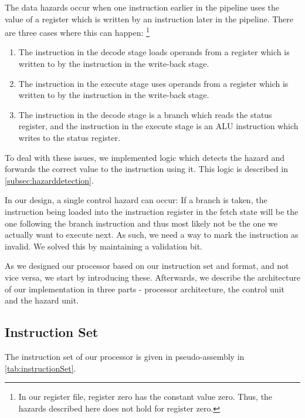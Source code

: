 \documentclass[11pt]{article}
\begin{document}
The data hazards occur when one instruction earlier in the pipeline
uses the value of a register which is written by an instruction later
in the pipeline. There are three cases where this can happen:
\footnote{In our register file, register zero has the constant value
  zero. Thus, the hazards described here does not hold for register
  zero.}
\begin{enumerate}
\item The instruction in the decode stage loads operands from a
  register which is written to by the instruction in the write-back
  stage. 
\item The instruction in the execute stage uses operands from a
  register which is written to by the instruction in the write-back
  stage.
\item The instruction in the decode stage is a branch which reads the
  status register, and the instruction in the execute stage is an ALU
  instruction which writes to the status register.
\end{enumerate}
To deal with these issues, we implemented logic which detects the
hazard and forwards the correct value to the instruction using
it. This logic is described in \autoref{subsec:hazarddetection}.

In our design, a single control hazard can occur: If a branch is
taken, the instruction being loaded into the instruction register in
the fetch state will be the one following the branch instruction and
thus most likely not be the one we actually want to execute next. As
such, we need a way to mark the instruction as invalid. We solved this
by maintaining a validation bit.

As we designed our processor based on our instruction set and format,
and not vice versa, we start by introducing these. Afterwards, we
describe the architecture of our implementation in three parts -
processor architecture, the control unit and the hazard unit.

\subsection{Instruction Set}
\label{subsec:instructionset} 
The instruction set of our processor is given in pseudo-assembly in \autoref{tab:instructionSet}. 
\end{document}
